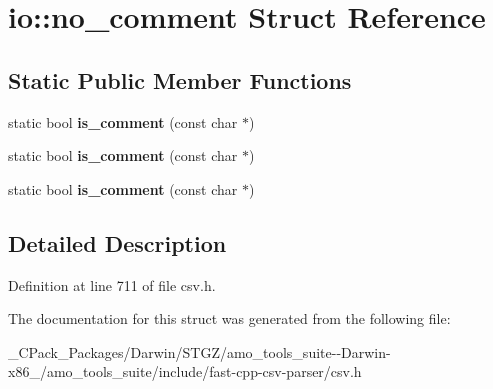 \hypertarget{structio_1_1no__comment}{}\section{io\+:\+:no\+\_\+comment Struct Reference}
\label{structio_1_1no__comment}
\subsection*{Static Public Member Functions}
\begin{DoxyCompactItemize}
\item 
\mbox{\label{structio_1_1no__comment_a52b252547482e28edd076ee2224bc8d8}} 
static bool {\bfseries is\+\_\+comment} (const char $\ast$)
\item 
\mbox{\label{structio_1_1no__comment_a52b252547482e28edd076ee2224bc8d8}} 
static bool {\bfseries is\+\_\+comment} (const char $\ast$)
\item 
\mbox{\label{structio_1_1no__comment_a52b252547482e28edd076ee2224bc8d8}} 
static bool {\bfseries is\+\_\+comment} (const char $\ast$)
\end{DoxyCompactItemize}


\subsection{Detailed Description}


Definition at line 711 of file csv.\+h.



The documentation for this struct was generated from the following file\+:\begin{DoxyCompactItemize}
\item 
\+\_\+\+C\+Pack\+\_\+\+Packages/\+Darwin/\+S\+T\+G\+Z/amo\+\_\+tools\+\_\+suite-\/-\/\+Darwin-\/x86\+\_/amo\+\_\+tools\+\_\+suite/include/fast-\/cpp-\/csv-\/parser/csv.\+h\end{DoxyCompactItemize}
